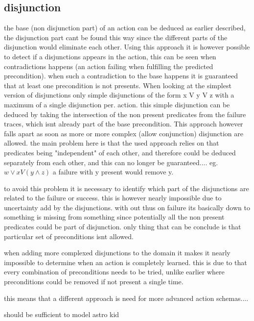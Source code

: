 \subsection{disjunction}
	the base (non disjunction part) of an action can be deduced as earlier described, the disjunction part cant be found this way since the different parts of the disjunction would eliminate each other. Using this approach it is however possible to detect if a disjunctions appears in the action, this can be seen when contradictions happens (an action failing when fulfilling the predicted precondition). when such a contradiction to the base happens it is guaranteed that at least one precondition is not presents. When looking at the simplest version of disjunctions only simple disjunctions of the form  x V y V z with a maximum of a single disjunction per. action. this simple disjunction can be deduced by taking the intersection of the non present predicates from the failure traces, which isnt already part of the base precondition. This approach however falls apart as soon as more or more complex (allow conjunction) disjunction are allowed. the main problem here is that the used approach relies on that predicates being "independent" of each other, and therefore could be deduced separately from each other, and this can no longer be guaranteed.... eg. $w \lor x V (y \land z )$ a failure with y present would remove y.
	
	to avoid this problem it is necessary to identify which part of the disjunctions are related to the failure or success. this is however nearly impossible due to uncertainty add by the disjunctions. with out thus on failure its basically down to something is missing from something since potentially all the non present predicates could be part of disjunction. only thing that can be conclude is that particular set of preconditions isnt allowed.
	
	
	when adding more complexed disjunctions to the domain it makes it nearly impossible to determine when an action is completely learned. this is due to that every combination of preconditions needs to be tried, unlike earlier where preconditions could be removed if not present a single time.
	
	 this means that a different approach is need for more advanced action schemas....  
	 
	should be sufficient to model astro kid
	 

	

%	
	
